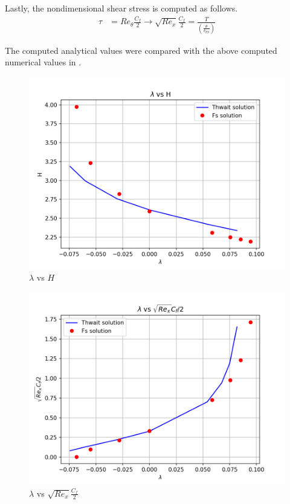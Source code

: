 \par Lastly, the nondimensional shear stress is computed as follows.
\begin{align*}
    \tau &= Re_\theta \frac{C_f}{2} \rightarrow \sqrt{Re_x}\frac{C_f}{2} = \frac{T}{\left(\frac{\theta}{\delta_{FS}}\right)}
\end{align*}

\par The computed analytical values were compared with the above computed
numerical values in . \\

\begin{figure}
   \centering
    \includegraphics[scale=0.5]{supporting_documents/02_question_2_and_3_codeDevelopment/03_postProcessing/lambda_vs_H_thwait.png}
    \caption{ $\lambda$ vs $H$}
    \label{plot_a_1}
\end{figure}

\begin{figure}
   \centering
    \includegraphics[scale=0.5]{supporting_documents/02_question_2_and_3_codeDevelopment/03_postProcessing/lambda_vs_Rex_Cf_thwait.png}
    \caption{ $\lambda$ vs $\sqrt{Re_x}\frac{C_f}{2}$}
    \label{plot_a_2}
\end{figure}

